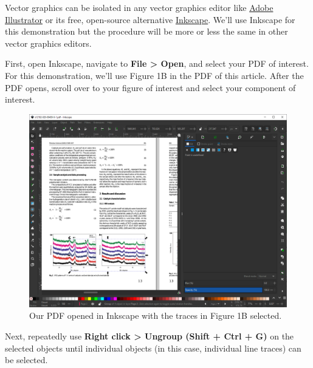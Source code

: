 \documentclass[letterpaper, 12pt]{article}
\begin{document}
Vector graphics can be isolated in any vector graphics editor like \href{https://www.adobe.com/products/illustrator.html}{Adobe Illustrator} or its free, open-source alternative \href{https://inkscape.org/}{Inkscape}. We'll use Inkscape for this demonstration but the procedure will be more or less the same in other vector graphics editors.

First, open Inkscape, navigate to \textbf{File > Open}, and select your PDF of interest. For this demonstration, we'll use Figure 1B in the PDF of this article. After the PDF opens, scroll over to your figure of interest and select your component of interest.

\begin{figure}[h!tbp]
    \includegraphics[width=\textwidth]{img/vector/in_inkscape.PNG}
    \caption*{Our PDF opened in Inkscape with the traces in Figure 1B selected.}
\end{figure}

\pagebreak
Next, repeatedly use \textbf{Right click > Ungroup (Shift + Ctrl + G)} on the selected objects until individual objects (in this case, individual line traces) can be selected.
\end{document}
